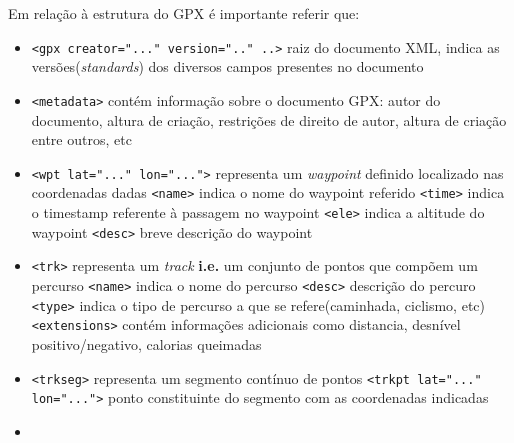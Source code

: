\documentclass{llncs}
\begin{document}
Em relação à estrutura do GPX é importante referir que:
\begin{itemize}
    \item \verb|<gpx creator="..." version=".." ..>| raiz do documento XML, indica as versões(\textit{standards}) dos diversos campos presentes no documento
    \item \verb|<metadata>| contém informação sobre o documento GPX: autor do documento, altura de criação, restrições de direito de autor, altura de criação entre outros, etc
    \item \verb|<wpt lat="..." lon="...">| representa um \textit{waypoint} definido  localizado nas coordenadas dadas
        \subitem \verb|<name>| indica o nome do waypoint referido
        \subitem \verb|<time>| indica o timestamp referente à passagem no waypoint
        \subitem \verb|<ele>| indica a altitude do waypoint
        \subitem \verb|<desc>| breve descrição do waypoint
    \item \verb|<trk>| representa um \textit{track} \textbf{i.e.} um conjunto de pontos que compõem um percurso
        \subitem \verb|<name>| indica o nome do percurso
        \subitem \verb|<desc>| descrição do percuro
        \subitem \verb|<type>| indica o tipo de percurso a que se refere(caminhada, ciclismo, etc)
        \subitem \verb|<extensions>| contém informações adicionais como distancia, desnível positivo/negativo, calorias queimadas
    \item \verb|<trkseg>| representa um segmento contínuo de pontos
        \subitem \verb|<trkpt lat="..." lon="...">| ponto constituinte do segmento com as coordenadas indicadas
    \item
        
\end{itemize}
\end{document}
